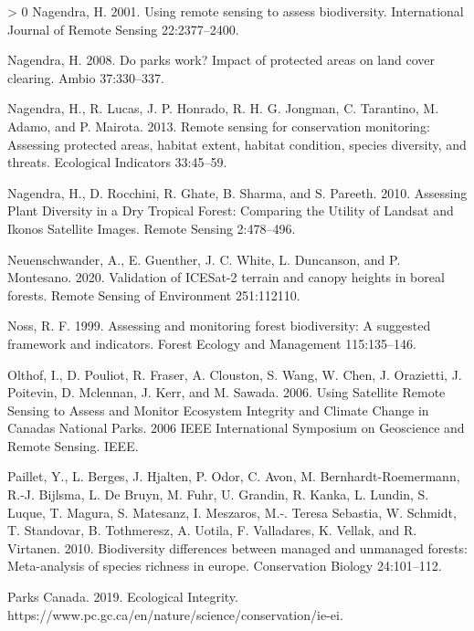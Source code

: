 \documentclass[11pt]{article}
\newlength{\cslhangindent}
\newenvironment{CSLReferences}[3] %
 {%
  \setlength{\parindent}{0pt}
  \ifodd #1 \everypar{\setlength{\hangindent}{\cslhangindent}}\ignorespaces\fi
  \ifnum #2 > 0
  \setlength{\parskip}{#2\baselineskip}
  \fi
 }%
 {}
\begin{document}
\begin{CSLReferences}{1}{0}
\leavevmode\hypertarget{ref-nagendra2001}{}%
Nagendra, H. 2001. Using remote sensing to assess biodiversity.
International Journal of Remote Sensing 22:2377--2400.

\leavevmode\hypertarget{ref-nagendraParksWorkImpact2008}{}%
Nagendra, H. 2008. Do parks work? Impact of protected areas on land
cover clearing. Ambio 37:330--337.

\leavevmode\hypertarget{ref-nagendraRemoteSensingConservation2013}{}%
Nagendra, H., R. Lucas, J. P. Honrado, R. H. G. Jongman, C. Tarantino,
M. Adamo, and P. Mairota. 2013. Remote sensing for conservation
monitoring: Assessing protected areas, habitat extent, habitat
condition, species diversity, and threats. Ecological Indicators
33:45--59.

\leavevmode\hypertarget{ref-nagendra2010}{}%
Nagendra, H., D. Rocchini, R. Ghate, B. Sharma, and S. Pareeth. 2010.
Assessing Plant Diversity in a Dry Tropical Forest: Comparing the
Utility of Landsat and Ikonos Satellite Images. Remote Sensing
2:478--496.

\leavevmode\hypertarget{ref-neuenschwander2020}{}%
Neuenschwander, A., E. Guenther, J. C. White, L. Duncanson, and P.
Montesano. 2020. Validation of ICESat-2 terrain and canopy heights in
boreal forests. Remote Sensing of Environment 251:112110.

\leavevmode\hypertarget{ref-noss1999}{}%
Noss, R. F. 1999. Assessing and monitoring forest biodiversity: A
suggested framework and indicators. Forest Ecology and Management
115:135--146.

\leavevmode\hypertarget{ref-olthofUsingSatelliteRemote2006}{}%
Olthof, I., D. Pouliot, R. Fraser, A. Clouston, S. Wang, W. Chen, J.
Orazietti, J. Poitevin, D. Mclennan, J. Kerr, and M. Sawada. 2006. Using
Satellite Remote Sensing to Assess and Monitor Ecosystem Integrity and
Climate Change in Canadas National Parks. 2006 IEEE International
Symposium on Geoscience and Remote Sensing. IEEE.

\leavevmode\hypertarget{ref-paillet2010}{}%
Paillet, Y., L. Berges, J. Hjalten, P. Odor, C. Avon, M.
Bernhardt-Roemermann, R.-J. Bijlsma, L. De Bruyn, M. Fuhr, U. Grandin,
R. Kanka, L. Lundin, S. Luque, T. Magura, S. Matesanz, I. Meszaros, M.-.
Teresa Sebastia, W. Schmidt, T. Standovar, B. Tothmeresz, A. Uotila, F.
Valladares, K. Vellak, and R. Virtanen. 2010. Biodiversity differences
between managed and unmanaged forests: Meta-analysis of species richness
in europe. Conservation Biology 24:101--112.

\leavevmode\hypertarget{ref-parkscanadaEcologicalIntegrity2019}{}%
Parks Canada. 2019. Ecological Integrity.
https://www.pc.gc.ca/en/nature/science/conservation/ie-ei.


\end{CSLReferences}
\end{document}

